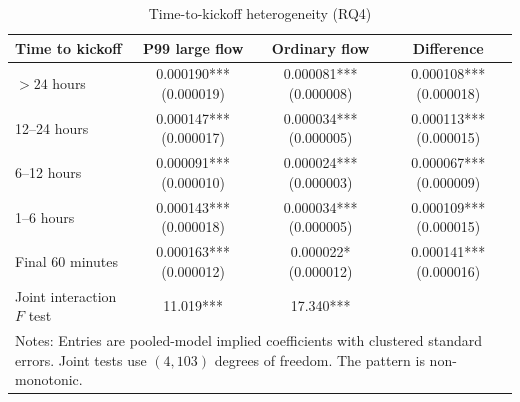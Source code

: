 \begin{table}[htbp]
\centering
\caption{Time-to-kickoff heterogeneity (RQ4)}
\label{tab:h4}
\small
\begin{tabular}{lccc}
\hline
Time to kickoff & P99 large flow & Ordinary flow & Difference \\
\hline
$>24$ hours & 0.000190*** (0.000019) & 0.000081*** (0.000008) & 0.000108*** (0.000018) \\
12--24 hours & 0.000147*** (0.000017) & 0.000034*** (0.000005) & 0.000113*** (0.000015) \\
6--12 hours & 0.000091*** (0.000010) & 0.000024*** (0.000003) & 0.000067*** (0.000009) \\
1--6 hours & 0.000143*** (0.000018) & 0.000034*** (0.000005) & 0.000109*** (0.000015) \\
Final 60 minutes & 0.000163*** (0.000012) & 0.000022* (0.000012) & 0.000141*** (0.000016) \\
\hline
Joint interaction $F$ test & 11.019*** & 17.340*** &  \\
\hline
\multicolumn{4}{p{0.92\textwidth}}{\footnotesize Notes: Entries are pooled-model implied coefficients with clustered standard errors. Joint tests use $(4,103)$ degrees of freedom. The pattern is non-monotonic.}
\end{tabular}
\end{table}
